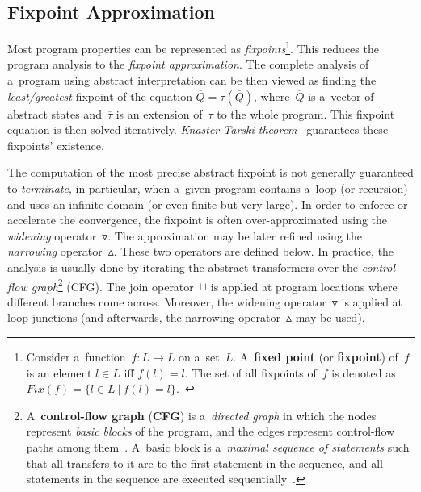 \subsection{Fixpoint Approximation~\cite{AILatticeModelCousot, wideningNarrowingCousot, savAI, staticAnalysisMoller, programAnalysisNielson, staticAnalysisRival}}
\label{sec:AIFixpoints}

Most program properties can be represented as \emph{fixpoints}\footnote{Consider a~function~$ f : L \rightarrow L $ on a~set~$ L $. A~\textbf{fixed point} (or \textbf{fixpoint}) of~$ f $ is an element $ l \in L $ iff $ f(l) = l $. The set of all fixpoints of~$ f $ is denoted as $ Fix(f) = \{l \in L\ |\ f(l) = l\} $.~\cite{programAnalysisNielson}}. This reduces the program analysis to the \emph{fixpoint approximation}. The complete analysis of a~program using abstract interpretation can be then viewed as finding the \emph{least/greatest} fixpoint of the equation $ \overline{Q} = \overline{\tau}(\overline{Q}) $, where~$ \overline{Q} $ is a~vector of abstract states and~$ \overline{\tau} $ is an extension of~$ \tau $ to the whole program. This fixpoint equation is then solved iteratively. \emph{Knaster-Tarski theorem}~\cite{tarski} guarantees these fixpoints' existence.

The computation of the most precise abstract fixpoint is not generally guaranteed to \emph{terminate}, in particular, when a~given program contains a~loop (or recursion) and uses an infinite domain (or even finite but very large). In order to enforce or accelerate the convergence, the fixpoint is often over-approximated using the \emph{widening} operator~$ \triangledown $. The approximation may be later refined using the \emph{narrowing} operator~$ \vartriangle $. These two operators are defined below. In practice, the analysis is usually done by iterating the abstract transformers over the \emph{control-flow graph}\footnote{A~\textbf{control-flow graph} (\textbf{CFG}) is a~\emph{directed graph} in which the nodes represent \emph{basic blocks} of the program, and the edges represent control-flow paths among them~\cite{controlFlowAnalysisAllen}. A~basic block is a~\emph{maximal sequence of statements} such that all transfers to it are to the first statement in the sequence, and all statements in the sequence are executed sequentially~\cite{programAnalysisNielson}.} (CFG). The join operator~$ \sqcup $ is applied at program locations where different branches come across. Moreover, the widening operator~$ \triangledown $ is applied at loop junctions (and afterwards, the narrowing operator~$ \vartriangle $ may be used).

